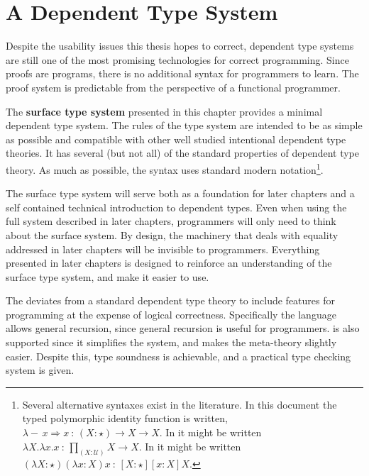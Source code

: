 \chapter{A Dependent Type System}
\label{chapter:Surface}
\thispagestyle{myheadings}
 
 
Despite the usability issues this thesis hopes to correct, dependent type systems are still one of the most promising technologies for correct programming.
Since proofs are programs, there is no additional syntax for programmers to learn.
The proof system is predictable from the perspective of a functional programmer.
 
The \textbf{surface type system} presented in this chapter provides a minimal dependent type system.
The rules of the type system are intended to be as simple as possible and compatible with other well studied intentional dependent type theories.
It has several (but not all) of the standard properties of dependent type theory.
As much as possible, the syntax uses standard modern notation\footnote{
 Several alternative syntaxes exist in the literature.
 In this document the typed polymorphic identity function is written, $\lambda-\,x\Rightarrow x\ :\,\left(X:\star\right)\rightarrow X\rightarrow X$.
 In \cite{HoTTbook} it might be written $\lambda X.\lambda x.x\ :\,\underset{\left(X:\mathcal{U}\right)}{\prod}X\rightarrow X$.
 In \cite{10.1016/0890-5401(88)90005-3} it might be written $\left(\lambda X:\star\right)\left(\lambda x:X\right)x\ :\,\left[X:\star\right]\left[x:X\right]X$.
}.
 
The surface type system will serve both as a foundation for later chapters and a self contained technical introduction to dependent types.
Even when using the full system described in later chapters, programmers will only need to think about the surface system.
By design, the machinery that deals with equality addressed in later chapters will be invisible to programmers.
Everything presented in later chapters is designed to reinforce an understanding of the surface type system, and make it easier to use.
 
The \slang{} deviates from a standard dependent type theory to include features for programming at the expense of logical correctness.
Specifically the language allows general recursion, since general recursion is useful for programmers.
\Tit{} is also supported since it simplifies the system, and makes the meta-theory slightly easier.
Despite this, type soundness is achievable, and a practical type checking system is given.
 
